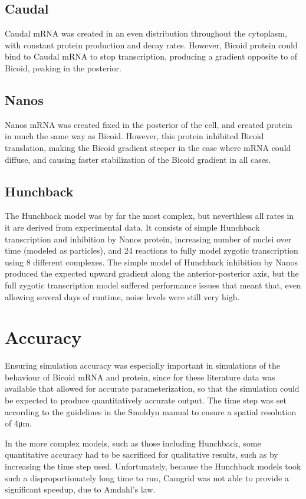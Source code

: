 \documentclass[11pt,a4paper,twocolumn]{article}
\begin{document}
\subsection{Caudal}
Caudal mRNA was created in an even distribution throughout the cytoplasm, with constant protein production and decay rates. However, Bicoid protein could bind to Caudal mRNA to stop transcription, producing a gradient opposite to of Bicoid, peaking in the posterior.
\subsection{Nanos}
Nanos mRNA was created fixed in the posterior of the cell, and created protein in much the same way as Bicoid. However, this protein inhibited Bicoid translation, making the Bicoid gradient steeper in the case where mRNA could diffuse, and causing faster stabilization of the Bicoid gradient in all cases.
\subsection{Hunchback}
The Hunchback model was by far the most complex, but neverthless all rates in it are derived from experimental data. It consists of simple Hunchback transcription and inhibition by Nanos protein, increasing number of nuclei over time (modeled as particles), and 24 reactions to fully model zygotic transcription using 8 different complexes. The simple model of Hunchback inhibition by Nanos produced the expected upward gradient along the anterior-posterior axis, but the full zygotic transcription model suffered performance issues that meant that, even allowing several days of runtime, noise levels were still very high.
\section{Accuracy}
Ensuring simulation accuracy was especially important in simulations of the behaviour of Bicoid mRNA and protein, since for these literature data was available that allowed for accurate parameterization, so that the simulation could be expected to produce quantitatively accurate output. The time step was set according to the guidelines in the Smoldyn manual to ensure a spatial resolution of 4μm. 

In the more complex models, such as those including Hunchback, some quantitative accuracy had to be sacrificed for qualitative results, such as by increasing the time step used. Unfortunately, because the Hunchback models took such a disproportionately long time to run, Camgrid was not able to provide a significant speedup, due to Amdahl’s law.
\end{document}
